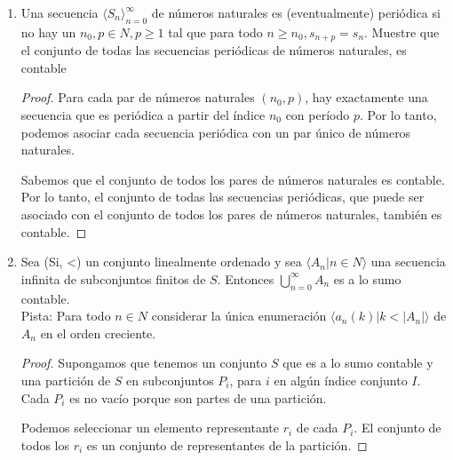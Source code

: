 \documentclass{article}
\begin{document}
\begin{enumerate}
    \begin{proof}
      Para cada par de números naturales $(n_0, s)$, hay exactamente una secuencia que es constante para todo $n \geq n_0$. Por lo tanto, podemos asociar cada secuencia eventualmente constante con un par único de números naturales.

      Sabemos que el conjunto de todos los pares de números naturales es contable. Por lo tanto, el conjunto de todas las secuencias eventualmente constantes, que puede ser asociado con el conjunto de todos los pares de números naturales, también es contable.
    \end{proof}

  \item Una secuencia $\langle S_n \rangle_{n=0}^{\infty}$ de números naturales es (eventualmente) periódica si no hay un $n_0,p \in N, p \geq 1 $ tal que para todo $n \geq n_0, s_{n+p}=s_n$. Muestre que el conjunto de todas las secuencias periódicas de números naturales, es contable
    \begin{proof}
      Para cada par de números naturales $(n_0, p)$, hay exactamente una secuencia que es periódica a partir del índice $n_0$ con período $p$. Por lo tanto, podemos asociar cada secuencia periódica con un par único de números naturales.

      Sabemos que el conjunto de todos los pares de números naturales es contable. Por lo tanto, el conjunto de todas las secuencias periódicas, que puede ser asociado con el conjunto de todos los pares de números naturales, también es contable.
    \end{proof}


  \item Sea (Si, <) un conjunto linealmente ordenado y sea $\langle A_n | n \in N \rangle$ una secuencia infinita de subconjuntos finitos de $S$. Entonces $\bigcup_{n=0}^{\infty } A_n$ es a lo sumo contable.\\ 
    Pista: Para todo $n \in N$ considerar la única enumeración $\langle a_n(k) | k < |A_n| \rangle$ de $A_n$ en el orden creciente.
    \begin{proof}
      Supongamos que tenemos un conjunto $S$ que es a lo sumo contable y una partición de $S$ en subconjuntos $P_i$, para $i$ en algún índice conjunto $I$. Cada $P_i$ es no vacío porque son partes de una partición.

      Podemos seleccionar un elemento representante $r_i$ de cada $P_i$. El conjunto de todos los $r_i$ es un conjunto de representantes de la partición.


\end{proof}
\end{enumerate}
\end{document}
